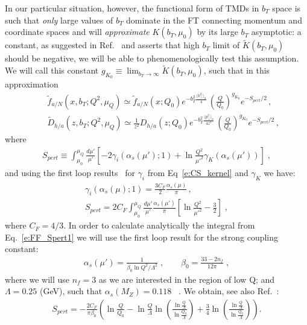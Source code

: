 \documentclass[final,3p,times,onecolumn,sort&compress,hidelinks]{elsarticle}
\newcommand\3[1]{\boldsymbol{#1}}
\begin{document}
In our particular situation, however,  the functional form of TMDs in $b_T$ space is such that {\em only} large values of $b_T$  dominate in the FT connecting momentum and coordinate spaces and will {\em approximate} $K(b_T,\mu_0)$ by its large $b_T$ asymptotic: a constant, as suggested in Ref.~\cite{Collins:2014jpa} and asserts that high $b_T$ limit of $\tilde K(b_T,\mu_0)$ should be negative, we will be able to phenomenologically test this assumption. We will
call this constant $g_{K_0}\equiv \lim_{b_T\to \infty} \tilde K(b_T,\mu_0)$, such that in this approximation
\begin{eqnarray}
&&\tilde f_{a/N} (x,b_T; Q^2, \mu_Q)\simeq \tilde f_{a/N} (x; Q_0) e^{-b_T^2 \frac{\langle k_\perp^2 \rangle_a}{4}}\,\left( \frac{Q}{Q_0}\right)^{g_{K_0}} e^{-S_{pert}/2}\,,
\nonumber \\[0.3cm]
&&\tilde D_{h/a}(z,b_T; Q^2, \mu_Q)\simeq \frac{1}{z^2} D_{h/a}(z; Q_0) e^{-b_T^2 \frac{\langle p_\perp^2 \rangle_a}{4 z^2}}\,\left( \frac{Q}{Q_0}\right)^{g_{K_0}}e^{-S_{pert}/2}\,,
\label{e:FF_ansatz1}
\end{eqnarray}
where
\begin{eqnarray}
S_{pert} \equiv \int_{\mu_0}^{\mu_Q} \frac{d \mu'}{\mu'}\left[
-2 \gamma_i(\alpha_s(\mu');1) +\ln\frac{Q^2}{\mu'^2}\gamma_K(\alpha_s(\mu'))
 \right] \; ,
 \label{e:FF_Spert}
\end{eqnarray}
and using the first loop results~\cite{Aybat:2011zv} for $\gamma_i$ from Eq~\eqref{e:CS_kernel} and $\gamma_K$  we have:
\begin{eqnarray}
\gamma_i(\alpha_s(\mu);1) = \frac{3 C_F}{2}  \frac{\alpha_s(\mu)}{\pi}  \, ,\\
S_{pert} = 2 C_F \int_{\mu_0}^{\mu_Q} \frac{d \mu'}{\mu'} \frac{\alpha_s(\mu')}{\pi} \left[\ln\frac{Q^2}{\mu'^2} - \frac{3}{2}
 \right] \; ,
 \label{e:FF_Spert1}
\end{eqnarray}
where $C_F = 4/3$. In order to calculate analytically the integral from Eq.~\eqref{e:FF_Spert1} we will use the first loop result for the strong coupling constant:
\begin{eqnarray}
\alpha_s(\mu') = \frac{1}{\beta_0 \ln Q^2/\Lambda^2} \; , \quad\quad
\beta_0 = \frac{33-2 n_f}{12 \pi}\; ,
 \label{e:as}
\end{eqnarray}
where we will use $n_f=3$ as we are interested in the region of low Q; and $\Lambda = 0.25$ (GeV), such that $\alpha_s(M_Z)= 0.118$ ~\cite{Bethke:2012jm}. We obtain, see also Ref.~\cite{Aidala:2014hva}:
\begin{eqnarray}
S_{pert} = -\frac{2 C_F}{\pi \beta_0}\left ( \ln \frac{Q}{Q_0} - \ln \frac{Q}{\Lambda} \ln \left(\frac{\ln \frac{Q}{\Lambda}}{\ln \frac{Q_0}{\Lambda}} \right)+
\frac{3}{4} \ln \left(\frac{\ln \frac{Q}{\Lambda}}{\ln \frac{Q_0}{\Lambda}} \right)\right).
 \label{e:FF_Spert_analytical}
\end{eqnarray}
\end{document}
